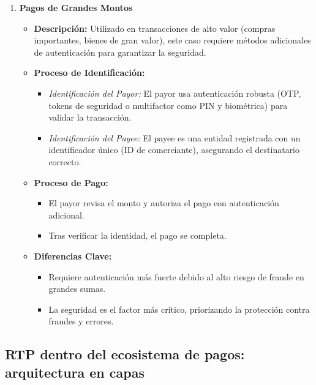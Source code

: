 \begin{enumerate}
    \item \textbf{Pagos de Grandes Montos}
    \begin{itemize}
        \item \textbf{Descripción:} Utilizado en transacciones de alto valor (compras importantes, bienes de gran valor), este caso requiere métodos adicionales de autenticación para garantizar la seguridad.
        \item \textbf{Proceso de Identificación:}
        \begin{itemize}
            \item \textit{Identificación del Payor:} El payor usa autenticación robusta (OTP, tokens de seguridad o multifactor como PIN y biométrica) para validar la transacción.
            \item \textit{Identificación del Payee:} El payee es una entidad registrada con un identificador único (ID de comerciante), asegurando el destinatario correcto.
        \end{itemize}
        \item \textbf{Proceso de Pago:}
        \begin{itemize}
            \item El payor revisa el monto y autoriza el pago con autenticación adicional.
            \item Tras verificar la identidad, el pago se completa.
        \end{itemize}
        \item \textbf{Diferencias Clave:}
        \begin{itemize}
            \item Requiere autenticación más fuerte debido al alto riesgo de fraude en grandes sumas.
            \item La seguridad es el factor más crítico, priorizando la protección contra fraudes y errores.
        \end{itemize}
    \end{itemize}
\end{enumerate}
\subsection{RTP dentro del ecosistema de pagos: arquitectura en capas}
\label{subsec:cubo-pagos}

